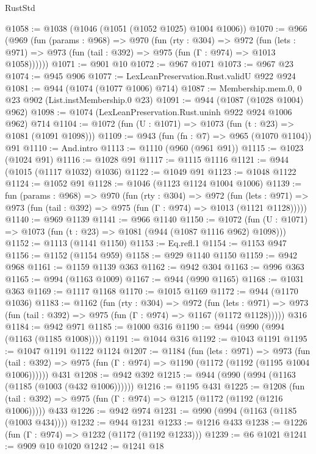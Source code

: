 \begin{lexlean}{RustStd}
\begin{coremodule}
{\begin{coremodule}
{{{{{{{{{{@1058 := @1038 (@1046 (@1051 (@1052 @1025) @1004 @1006))
@1070 := @966
    (@969
      (fun (params : @968) =>
      @970
        (fun (rty : @304) =>
        @972
          (fun (lets : @971) => @973 (fun (tail : @392) => @975 (fun (Γ : @974) => @1013 @1058))))))
@1071 := @901 @10
@1072 := @967 @1071
@1073 := @967 @23
@1074 := @945 @906
@1077 := LexLeanPreservation.Rust.validU @922 @924
@1081 := @944 (@1074 (@1077 @1006) @714)
@1087 := Membership.mem.{0, 0} @23 @902 (List.instMembership.{0} @23)
@1091 := @944 (@1087 (@1028 @1004) @962)
@1098 := @1074 (LexLeanPreservation.Rust.uninh @922 @924 @1006 @962) @714
@1104 := @1072 (fun (U : @1071) => @1073 (fun (t : @23) => @1081 (@1091 @1098)))
@1109 := @943 (fun (fn : @7) => @965 (@1070 @1104)) @91
@1110 := And.intro
@1113 := @1110 (@960 (@961 @91))
@1115 := @1023 (@1024 @91)
@1116 := @1028 @91
@1117 := @1115 @1116
@1121 := @944 (@1015 (@1117 @1032) @1036)
@1122 := @1049 @91
@1123 := @1048 @1122
@1124 := @1052 @91
@1128 := @1046 (@1123 @1124 @1004 @1006)
@1139 := fun (params : @968) =>
  @970
    (fun (rty : @304) =>
    @972
      (fun (lets : @971) =>
      @973 (fun (tail : @392) => @975 (fun (Γ : @974) => @1013 (@1121 @1128)))))
@1140 := @969 @1139
@1141 := @966 @1140
@1150 := @1072 (fun (U : @1071) => @1073 (fun (t : @23) => @1081 (@944 (@1087 @1116 @962) @1098)))
@1152 := @1113 (@1141 @1150)
@1153 := Eq.refl.{1}
@1154 := @1153 @947
@1156 := @1152 (@1154 @959)
@1158 := @929 @1140 @1150
@1159 := @942 @968
@1161 := @1159 @1139 @363
@1162 := @942 @304
@1163 := @996 @363
@1165 := @994 (@1163 @1009)
@1167 := @944 (@990 @1165)
@1168 := @1031 @363
@1169 := @1117 @1168
@1170 := @1015 @1169
@1172 := @944 (@1170 @1036)
@1183 := @1162
    (fun (rty : @304) =>
    @972
      (fun (lets : @971) =>
      @973 (fun (tail : @392) => @975 (fun (Γ : @974) => @1167 (@1172 @1128)))))
    @316
@1184 := @942 @971
@1185 := @1000 @316
@1190 := @944 (@990 (@994 (@1163 (@1185 @1008))))
@1191 := @1044 @316
@1192 := @1043 @1191
@1195 := @1047 @1191 @1122 @1124
@1207 := @1184
    (fun (lets : @971) =>
    @973 (fun (tail : @392) => @975 (fun (Γ : @974) => @1190 (@1172 (@1192 (@1195 @1004 @1006))))))
    @431
@1208 := @942 @392
@1215 := @944 (@990 (@994 (@1163 (@1185 (@1003 (@432 @1006))))))
@1216 := @1195 @431
@1225 := @1208
    (fun (tail : @392) => @975 (fun (Γ : @974) => @1215 (@1172 (@1192 (@1216 @1006)))))
    @433
@1226 := @942 @974
@1231 := @990 (@994 (@1163 (@1185 (@1003 @434))))
@1232 := @944 @1231
@1233 := @1216 @433
@1238 := @1226 (fun (Γ : @974) => @1232 (@1172 (@1192 @1233)))
@1239 := @6 @1021
@1241 := @909 @10 @1020
@1242 := @1241 @18
}}}}}}}}}}
\end{coremodule}}
\end{coremodule}
\end{lexlean}
